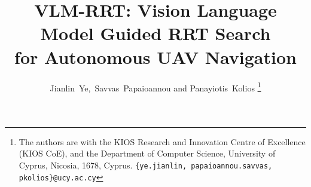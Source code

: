 \documentclass[letterpaper, 10 pt, conference]{ieeeconf}
\begin{document}
\title{VLM-RRT: Vision Language Model Guided RRT Search \\ for Autonomous UAV Navigation}
\author{Jianlin~Ye,~Savvas~Papaioannou and Panayiotis~Kolios%
\thanks{The authors are with the KIOS Research and Innovation Centre of Excellence (KIOS CoE), and the Department of Computer Science, University of Cyprus, Nicosia, 1678, Cyprus. {\tt\small \{ye.jianlin,  papaioannou.savvas, pkolios\}@ucy.ac.cy}}
}
\maketitle










\flushbottom
\balance


 
\end{document}
